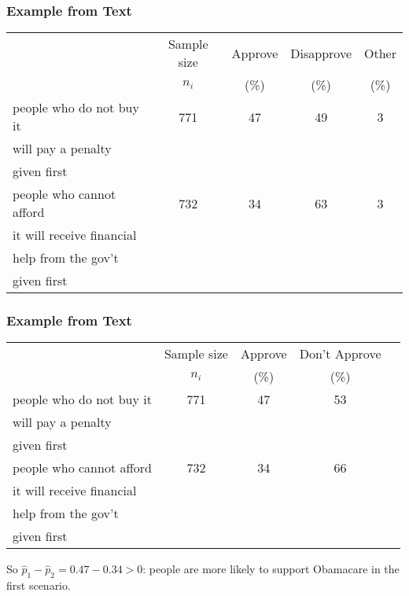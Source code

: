 \documentclass[handout]{beamer}
\newcommand{\blue}[1]{\textcolor{blue2}{#1}}
\newcommand{\phat}{\widehat{p}}
\begin{document}
\begin{frame}[fragile]
\frametitle{Example from Text}

\begin{small}
\begin{center}
  \begin{tabular}{l|cccc}
     & Sample size & Approve & Disapprove & Other \\ 
     &  $n_i$ & (\%) & (\%) &  (\%)\\   
    \hline
    \blue{people who do not buy it}   & 771 & 47 & 49 & 3 \\ 
    \blue{will pay a penalty}  & &  &  &  \\ 
    given first & &  &  &  \\     
    \hline
    \blue{people who cannot afford} & 732 & 34 & 63 & 3 \\ 
    \blue{it will receive financial}  & & & &  \\ 
    \blue{help from the gov't} & & & &  \\ 
    given first & & & &  \\    
   \end{tabular}
\end{center}
\end{small}

\end{frame}


\begin{frame}[fragile]
\frametitle{Example from Text}

\begin{small}
\begin{center}
  \begin{tabular}{l|cccc}
     & Sample size & Approve & Don't Approve \\ 
     &  $n_i$ & (\%) & (\%) \\   
  \hline
    \blue{people who do not buy it}   & 771 & 47 & 53 \\ 
    \blue{will pay a penalty}\\ 
    given first\\     
    \hline
    \blue{people who cannot afford} & 732 & 34 & 66 \\ 
    \blue{it will receive financial}\\ 
    \blue{help from the gov't}\\ 
    given first\\    
   \end{tabular}
\end{center}
\end{small}
\pause So $\phat_1 - \phat_2 = 0.47 - 0.34 > 0$:  people are more likely to support Obamacare in the first scenario.
\end{frame}
\end{document}
